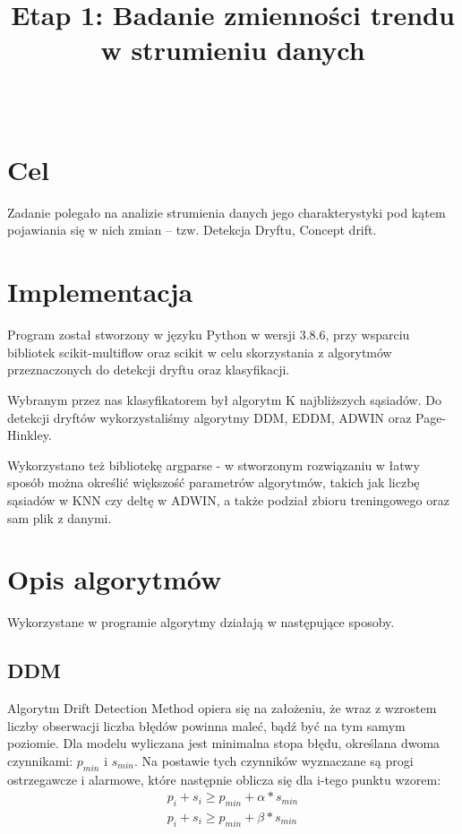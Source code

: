 \documentclass{classrep}
\author{%
  \studentinfo{Paweł Galewicz}{234053}\\
  \studentinfo{Karol Podlewski}{234106}%
}
\title{Etap 1: Badanie zmienności trendu\\w strumieniu danych}
\begin{document}
\maketitle


\tableofcontents
{}
\newpage

\section{Cel}

Zadanie polegało na analizie strumienia danych jego charakterystyki pod kątem pojawiania się w nich zmian – tzw. Detekcja Dryftu, Concept drift.

\section{Implementacja}

Program został stworzony w języku Python w wersji 3.8.6, przy wsparciu bibliotek scikit-multiflow oraz scikit w celu skorzystania z algorytmów przeznaczonych do detekcji dryftu oraz klasyfikacji.

Wybranym przez nas klasyfikatorem był algorytm K najbliższych sąsiadów. Do detekcji dryftów wykorzystaliśmy algorytmy DDM, EDDM, ADWIN oraz Page-Hinkley.

Wykorzystano też bibliotekę argparse - w stworzonym rozwiązaniu w łatwy sposób można określić większość parametrów algorytmów, takich jak liczbę sąsiadów w KNN czy deltę w ADWIN, a także podział zbioru treningowego oraz sam plik z danymi.

\section{Opis algorytmów}

Wykorzystane w programie algorytmy działają w następujące sposoby.

\subsection{DDM}

Algorytm Drift Detection Method opiera się na założeniu, że wraz z wzrostem liczby obserwacji liczba błędów powinna maleć, bądź być na tym samym poziomie. Dla modelu wyliczana jest minimalna stopa błędu, określana dwoma czynnikami: $p_{min}$ i $s_{min}$. Na postawie tych czynników wyznaczane są progi ostrzegawcze i alarmowe, które następnie oblicza się dla i-tego punktu wzorem:
\begin{align*}
    p_i + s_i \geq p_{min} + \alpha * s_{min}\\
    p_i + s_i \geq p_{min} + \beta * s_{min}
\end{align*}
\end{document}
